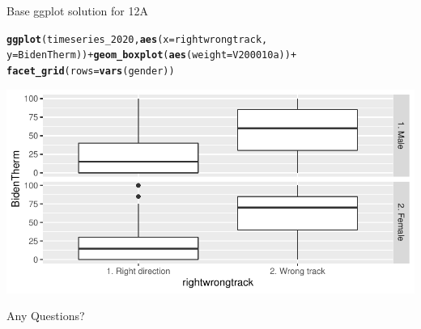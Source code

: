 \documentclass{beamer}\usepackage[]{graphicx}\usepackage[]{xcolor}
\makeatletter
\newcommand{\hlopt}[1]{\textcolor[rgb]{0,0,0}{#1}}%
\newcommand{\hlstd}[1]{\textcolor[rgb]{0.345,0.345,0.345}{#1}}%
\newcommand{\hlkwc}[1]{\textcolor[rgb]{0.333,0.667,0.333}{#1}}%
\newcommand{\hlkwd}[1]{\textcolor[rgb]{0.737,0.353,0.396}{\textbf{#1}}}%
\newenvironment{kframe}{%
 \def\at@end@of@kframe{}%
 \ifinner\ifhmode%
  \def\at@end@of@kframe{\end{minipage}}%
  \begin{minipage}{\columnwidth}%
 \fi\fi%
 \def\FrameCommand##1{\hskip\@totalleftmargin \hskip-\fboxsep
 \colorbox{shadecolor}{##1}\hskip-\fboxsep
     \hskip-\linewidth \hskip-\@totalleftmargin \hskip\columnwidth}%
 \MakeFramed {\advance\hsize-\width
   \@totalleftmargin\z@ \linewidth\hsize
   \@setminipage}}%
 {\par\unskip\endMakeFramed%
 \at@end@of@kframe}
\newenvironment{knitrout}{}{} %
\makeatother
\begin{document}
\begin{frame}[fragile]{Base ggplot solution for 12A}
\begin{knitrout}
\color{fgcolor}\begin{kframe}
\begin{alltt}
\hlkwd{ggplot}\hlstd{(timeseries_2020,} \hlkwd{aes}\hlstd{(}\hlkwc{x} \hlstd{= rightwrongtrack,}
    \hlkwc{y} \hlstd{= BidenTherm))} \hlopt{+} \hlkwd{geom_boxplot}\hlstd{(}\hlkwd{aes}\hlstd{(}\hlkwc{weight} \hlstd{= V200010a))} \hlopt{+}
    \hlkwd{facet_grid}\hlstd{(}\hlkwc{rows} \hlstd{=} \hlkwd{vars}\hlstd{(gender))}
\end{alltt}
\end{kframe}
\includegraphics[width=0.95\linewidth]{figure/unnamed-chunk-70-1} 
\end{knitrout}

\end{frame}
\begin{frame}{Any Questions?}
\end{frame}
\end{document}
